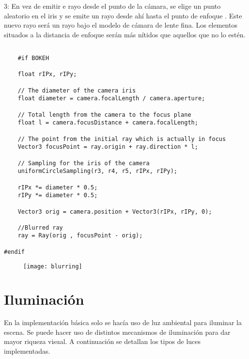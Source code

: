 	3: En vez de emitir e rayo desde el punto de la cámara, se elige un punto aleatorio en el iris  y se emite un rayo desde ahí hasta el punto de enfoque . Este nuevo rayo será un rayo bajo el modelo de cámara de lente fina. Los elementos situados a la distancia de enfoque  serán más nítidos que aquellos que no lo estén.

\begin{lstlisting}
	
	#if BOKEH
	
    float rIPx, rIPy;

    // The diameter of the camera iris
    float diameter = camera.focalLength / camera.aperture;

    // Total length from the camera to the focus plane
    float l = camera.focusDistance + camera.focalLength;

    // The point from the initial ray which is actually in focus
    Vector3 focusPoint = ray.origin + ray.direction * l;

    // Sampling for the iris of the camera
    uniformCircleSampling(r3, r4, r5, rIPx, rIPy);

    rIPx *= diameter * 0.5;
    rIPy *= diameter * 0.5;

    Vector3 orig = camera.position + Vector3(rIPx, rIPy, 0);

    //Blurred ray
    ray = Ray(orig , focusPoint - orig);

#endif 

\end{lstlisting}

	\begin{figure}
		\centering
		\texttt{[image: blurring]}
		\caption{}
		\label{fig:label}
	\end{figure}
	
	
	\section{Iluminación}
	
	En la implementación básica solo se hacía uso de luz ambiental para iluminar la escena. Se puede hacer uso de distintos mecanismos de iluminación para dar mayor riqueza visual. A continuación se detallan los tipos de luces implementadas.
	
